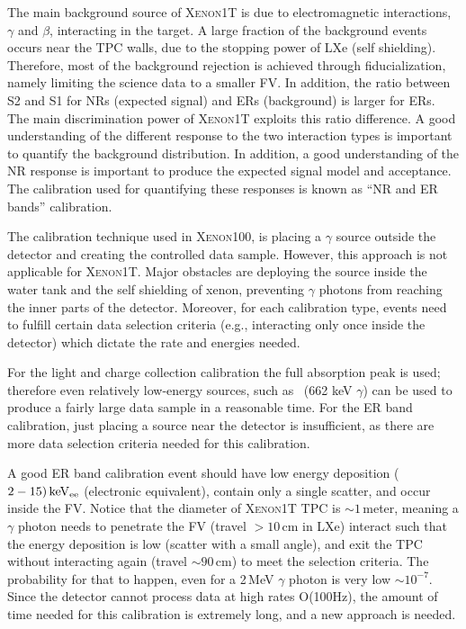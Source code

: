 The main background source of \textsc{Xenon1T} is due to electromagnetic interactions, $\gamma$ and $\beta$, interacting in the target. A large fraction of the background events occurs near the TPC walls, due to the stopping power of LXe (self shielding). Therefore, most of the background rejection is achieved through fiducialization, namely limiting the science data to a smaller FV. In addition, the ratio between S2 and S1 for NRs (expected signal) and ERs (background) is larger for ERs. The main discrimination power of \textsc{Xenon1T} exploits this ratio difference. A good understanding of the different response to the two interaction types is important to quantify the background distribution. In addition, a good understanding of the NR response is important to produce the expected signal model and acceptance. The calibration used for quantifying these responses is known as ``NR and ER bands'' calibration.    

The calibration technique used in \textsc{Xenon100}, is placing a $\gamma$ source outside the detector and creating the controlled data sample. However, this approach is not applicable for \textsc{Xenon1T}. Major obstacles are deploying the source inside the water tank and the self shielding of xenon, preventing $\gamma$ photons from reaching the inner parts of the detector. Moreover, for each calibration type, events need to fulfill certain data selection criteria (e.g., interacting only once inside the detector) which dictate the rate and energies needed. 

For the light and charge collection calibration the full absorption peak is used; therefore even relatively low-energy sources, such as \Cs\ (662 keV $\gamma$) can be used to produce a fairly large data sample in a reasonable time. For the ER band calibration, just placing a source near the detector is insufficient, as there are more data selection criteria needed for this calibration. 

A good ER band calibration event should have low energy deposition ($2-15)\,\mathrm{keV_\mathrm{ee}}$ (electronic equivalent), contain only a single scatter, and occur inside the FV. Notice that the diameter of \textsc{Xenon1T} TPC is $\sim 1$\,meter, meaning a $\gamma$ photon needs to penetrate the FV (travel $> 10$\,cm in LXe) interact such that the energy deposition is low (scatter with a small angle), and exit the TPC without interacting again (travel $\sim 90$\,cm) to meet the selection criteria. The probability for that to happen, even for a 2\,MeV $\gamma$ photon is very low $\sim 10^{-7}$. Since the detector cannot process data at high rates O(100Hz), the amount of time needed for this calibration is extremely long, and a new approach is needed.


